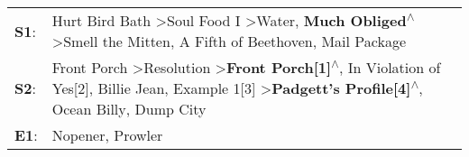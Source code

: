 \begin{supertabular}{p{0.03\textwidth}p{0.92\textwidth}}
 \textbf{S1}:  &                                                                                                           Hurt Bird Bath\textsuperscript{} \textgreater \enspace Soul Food I\textsuperscript{} \textgreater \enspace Water\textsuperscript{}, \enspace \textbf{Much Obliged\textsuperscript{$\wedge$}} \textgreater \enspace Smell the Mitten\textsuperscript{}, \enspace A Fifth of Beethoven\textsuperscript{}, \enspace Mail Package\textsuperscript{}  \enspace  \\
 \textbf{S2}:  &  Front Porch\textsuperscript{} \textgreater \enspace Resolution\textsuperscript{} \textgreater \enspace \textbf{Front Porch[1]\textsuperscript{$\wedge$}}, \enspace In Violation of Yes[2]\textsuperscript{}, \enspace Billie Jean\textsuperscript{}, \enspace Example 1[3]\textsuperscript{} \textgreater \enspace \textbf{Padgett's Profile[4]\textsuperscript{$\wedge$}}, \enspace Ocean Billy\textsuperscript{}, \enspace Dump City\textsuperscript{}  \enspace  \\
 \textbf{E1}:  &                                                                                                                                                                                                                                                                                                                                                                                             Nopener\textsuperscript{}, \enspace Prowler\textsuperscript{}  \enspace  \\
\end{supertabular}
